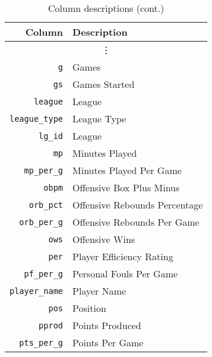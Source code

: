\begin{table}[H]
  \centering
  \caption{Column descriptions (cont.)}
  \begin{tabular}{rl}
    \toprule
    \textbf{Column} & \textbf{Description} \\
    \midrule
    \multicolumn{2}{c}{\vdots} \\
    \texttt{g}                   & Games                                                         \\
    \texttt{gs}                  & Games Started                                                 \\
    \texttt{league}              & League                                                        \\
    \texttt{league\_type}        & League Type                                                   \\
    \texttt{lg\_id}              & League                                                        \\
    \texttt{mp}                  & Minutes Played                                                \\
    \texttt{mp\_per\_g}          & Minutes Played Per Game                                       \\
    \texttt{obpm}                & Offensive Box Plus Minus                                      \\
    \texttt{orb\_pct}            & Offensive Rebounds Percentage                                 \\
    \texttt{orb\_per\_g}         & Offensive Rebounds Per Game                                   \\
    \texttt{ows}                 & Offensive Wins                                                \\
    \texttt{per}                 & Player Efficiency Rating                                      \\
    \texttt{pf\_per\_g}          & Personal Fouls Per Game                                       \\
    \texttt{player\_name}        & Player Name                                                   \\
    \texttt{pos}                 & Position                                                      \\
    \texttt{pprod}               & Points Produced                                               \\
    \texttt{pts\_per\_g}         & Points Per Game                                               \\

\end{tabular}
\end{table}
